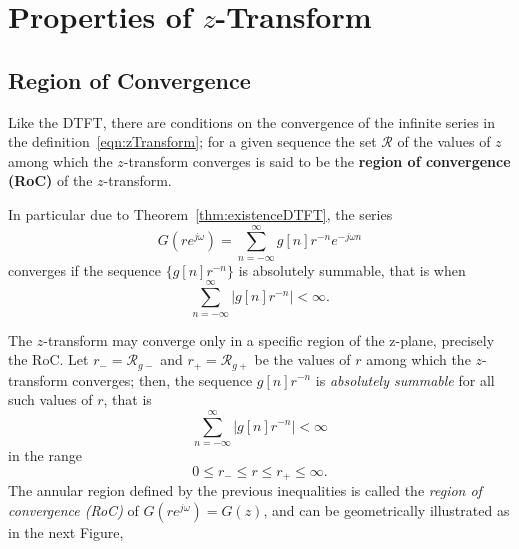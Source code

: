 \documentclass[\documentfontsize, twocolumn]{\classname}
\begin{document}
\section{Properties of $z$-Transform}

\subsection{Region of Convergence}

Like the DTFT, there are conditions on the convergence of the infinite series in the definition~\ref{eqn:zTransform}; for a given sequence the set $\mathcal R$ of the values of $z$ among which the $z$-transform converges is said to be the \textbf{region of convergence (RoC)} of the $z$-transform.

In particular due to Theorem~\ref{thm:existenceDTFT}, the series
\[
    G(re^{j\omega}) = \sum_{n=-\infty}^\infty g[n] r^{-n} e^{-j\omega n}
\]
converges if the sequence $\{g[n]r^{-n}\}$ is absolutely summable, that is when
\[
    \sum_{n=-\infty}^\infty \left|g[n] r^{-n}\right| < \infty.
\]

The $z$-transform may converge only in a specific region of the z-plane, precisely the RoC. Let $r_-=\mathcal R_{g-}$ and $r_+ = \mathcal R_{g+}$ be the values of $r$ among which the $z$-transform converges; then, the sequence $g[n]r^{-n}$ is \emph{absolutely summable} for all such values of $r$, that is
\[
    \sum_{n=-\infty}^\infty \left|g[n] r^{-n}\right| < \infty
\]
in the range \[ 0 \leq r_- \leq r \leq r_+ \leq \infty.\] The annular region defined by the previous inequalities is called the \emph{region of convergence (RoC)} of $G(re^{j\omega}) = G(z)$, and can be geometrically illustrated as in the next Figure,

\begin{center}
\end{center}
\end{document}
